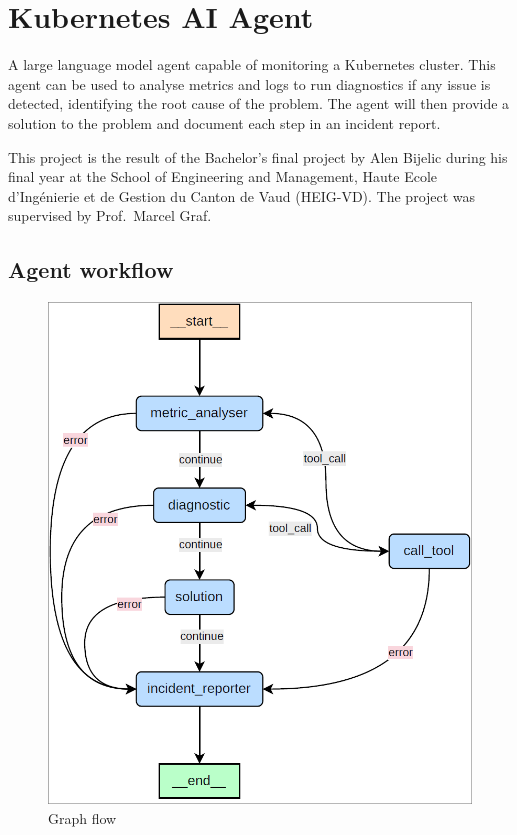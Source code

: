 \documentclass[
]{article}
\author{}
\date{}
\begin{document}
\hypertarget{kubernetes-ai-agent}{%
\section{Kubernetes AI Agent}\label{kubernetes-ai-agent}}

A large language model agent capable of monitoring a Kubernetes cluster.
This agent can be used to analyse metrics and logs to run diagnostics if
any issue is detected, identifying the root cause of the problem. The
agent will then provide a solution to the problem and document each step
in an incident report.

This project is the result of the Bachelor's final project by Alen
Bijelic during his final year at the School of Engineering and
Management, Haute Ecole d'Ingénierie et de Gestion du Canton de Vaud
(HEIG-VD). The project was supervised by Prof.~Marcel Graf.

\hypertarget{agent-workflow}{%
\subsection{Agent workflow}\label{agent-workflow}}

\begin{figure}
\centering
\includegraphics{img/realisation_langgraphworkflow.png}
\caption{Graph flow}
\end{figure}
\end{document}
